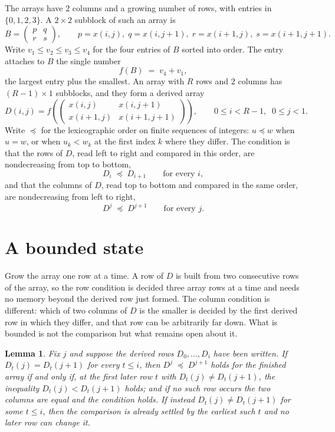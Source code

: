 \documentclass[11pt,a4paper]{article}
\theoremstyle{plain}
\newtheorem{lemma}[theorem]{Lemma}
\theoremstyle{definition}
\begin{document}
The arrays have $2$ columns and a growing number of rows, with entries in $\{0,1,2,3\}$. A
$2\times2$ subblock of such an array is
\[
B=\begin{pmatrix} p & q \\ r & s \end{pmatrix},
\qquad p=x(i,j),\; q=x(i,j+1),\; r=x(i+1,j),\; s=x(i+1,j+1).
\]
Write $v_1\le v_2\le v_3\le v_4$ for the four entries of $B$ sorted into order. The entry attaches to $B$ the single number
\[
f(B)\;=\;v_4+v_1,
\]
the largest entry plus the smallest. An array with $R$ rows and $2$ columns has $(R-1)\times1$ subblocks, and they
form a derived array
\[
D(i,j)=f\!\left(\begin{pmatrix} x(i,j) & x(i,j+1) \\ x(i+1,j) & x(i+1,j+1)\end{pmatrix}
\right),\qquad 0\le i<R-1,\;\; 0\le j<1 .
\]
Write $\preceq$ for the lexicographic order on finite sequences of integers: $u\preceq w$ when
$u=w$, or when $u_k<w_k$ at the first index $k$ where they differ. The condition is that the
rows of $D$, read left to right and compared in this order, are nondecreasing from top to bottom,
\[
D_{i}\;\preceq\;D_{i+1}\qquad\text{for every } i,
\]
and that the columns of $D$, read top to bottom and compared in the same order, are nondecreasing
from left to right,
\[
D^{j}\;\preceq\;D^{j+1}\qquad\text{for every } j .
\]

\section{A bounded state}

Grow the array one row at a time. A row of $D$ is built from two consecutive rows of the array,
so the row condition is decided three array rows at a time and needs no memory beyond the
derived row just formed. The column condition is different: which of two columns of $D$ is the
smaller is decided by the first derived row in which they differ, and that row can be
arbitrarily far down. What is bounded is not the comparison but what remains open about it.

\begin{lemma}\label{lem:bits}
Fix $j$ and suppose the derived rows $D_0,\dots,D_i$ have been written. If $D_t(j)=D_t(j+1)$ for
every $t\le i$, then $D^{j}\;\preceq\;D^{j+1}$ holds for the finished array if and only if,
at the first later row $t$ with $D_t(j)\neq D_t(j+1)$, the inequality $D_t(j)<D_t(j+1)$
holds; and if no such row occurs the two columns are equal and the condition holds. If instead
$D_t(j)\neq D_t(j+1)$ for some $t\le i$, then the comparison is already settled by the earliest
such $t$ and no later row can change it.
\end{lemma}
\end{document}
